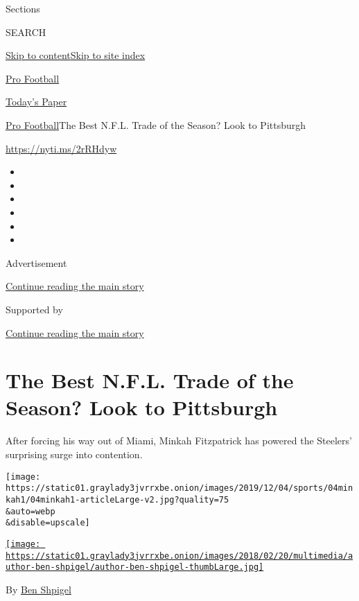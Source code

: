 Sections

SEARCH

\protect\hyperlink{site-content}{Skip to
content}\protect\hyperlink{site-index}{Skip to site index}

\href{https://www.nytimes3xbfgragh.onion/section/sports/football}{Pro
Football}

\href{https://myaccount.nytimes3xbfgragh.onion/auth/login?response_type=cookie\&client_id=vi}{}

\href{https://www.nytimes3xbfgragh.onion/section/todayspaper}{Today's
Paper}

\href{/section/sports/football}{Pro Football}\textbar{}The Best N.F.L.
Trade of the Season? Look to Pittsburgh

\url{https://nyti.ms/2rRHdyw}

\begin{itemize}
\item
\item
\item
\item
\item
\item
\end{itemize}

Advertisement

\protect\hyperlink{after-top}{Continue reading the main story}

Supported by

\protect\hyperlink{after-sponsor}{Continue reading the main story}

\hypertarget{the-best-nfl-trade-of-the-season-look-to-pittsburgh}{%
\section{The Best N.F.L. Trade of the Season? Look to
Pittsburgh}\label{the-best-nfl-trade-of-the-season-look-to-pittsburgh}}

After forcing his way out of Miami, Minkah Fitzpatrick has powered the
Steelers' surprising surge into contention.

\texttt{[image: https://static01.graylady3jvrrxbe.onion/images/2019/12/04/sports/04minkah1/04minkah1-articleLarge-v2.jpg?quality=75\\\&auto=webp\\\&disable=upscale]}

\href{https://www.nytimes3xbfgragh.onion/by/ben-shpigel}{\texttt{[image: https://static01.graylady3jvrrxbe.onion/images/2018/02/20/multimedia/author-ben-shpigel/author-ben-shpigel-thumbLarge.jpg]}}

By \href{https://www.nytimes3xbfgragh.onion/by/ben-shpigel}{Ben Shpigel}

